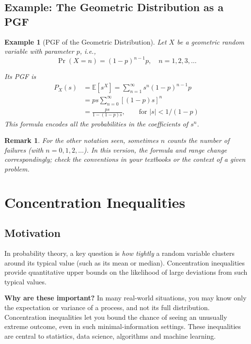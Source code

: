 \documentclass[12pt]{article}
\newtheorem{remark}[theorem]{Remark}
\newtheorem{example}[theorem]{Example}
\newcommand{\E}{\mathbb{E}}
\begin{document}
\subsection{Example: The Geometric Distribution as a PGF}
\begin{example}[PGF of the Geometric Distribution]
Let $X$ be a geometric random variable with parameter $p$, i.e.,
\[
    \Pr(X = n) = (1-p)^{n-1}p, \quad n = 1,2,3,\ldots
\]

Its PGF is
\begin{align*}
    P_X(s) &= \E[s^X] = \sum_{n=1}^{\infty} s^{n} (1-p)^{n-1} p \\
           &= p s \sum_{n=0}^{\infty} [(1-p) s]^n \\
           &= \frac{p s}{1 - (1-p)s}, \qquad \text{for } |s| < 1/(1-p)
\end{align*}
This formula encodes all the probabilities in the coefficients of $s^n$.
\end{example}

\begin{remark}
For the other notation seen, sometimes $n$ counts the number of failures (with $n = 0,1,2,\dotsc$). In this version, the formula and range change correspondingly; check the conventions in your textbooks or the context of a given problem.
\end{remark}

\section{Concentration Inequalities}

\subsection{Motivation}
In probability theory, a key question is \emph{how tightly} a random variable clusters around its typical value (such as its mean or median). Concentration inequalities provide quantitative upper bounds on the likelihood of large deviations from such typical values.

\textbf{Why are these important?} In many real-world situations, you may know only the expectation or variance of a process, and not its full distribution. Concentration inequalities let you bound the chance of seeing an unusually extreme outcome, even in such minimal-information settings. These inequalities are central to statistics, data science, algorithms and machine learning.
\end{document}
